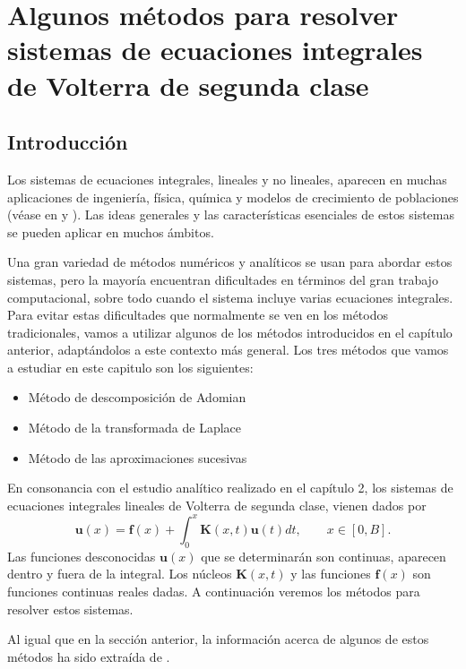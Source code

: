 \chapter{Algunos métodos para resolver sistemas de ecuaciones integrales de Volterra de segunda clase}
\section{Introducción}
Los sistemas de ecuaciones integrales, lineales y no lineales, aparecen en muchas aplicaciones de ingeniería, física, química y modelos de crecimiento de poblaciones (véase en \cite{sistemas1} y \cite{sistemas2}). Las ideas generales y las características esenciales de estos sistemas se pueden aplicar en muchos ámbitos.

Una gran variedad de métodos numéricos y analíticos se usan para abordar estos sistemas, pero la mayoría encuentran dificultades en términos del gran trabajo computacional, sobre todo cuando el sistema incluye varias ecuaciones integrales. Para evitar estas dificultades que normalmente se ven en los métodos tradicionales, vamos a utilizar algunos de los métodos introducidos en el capítulo anterior, adaptándolos a este contexto más general. Los tres métodos que vamos a estudiar en este capitulo son los siguientes:
\begin{itemize}
	\item Método de descomposición de Adomian
	\item Método de la transformada de Laplace
	\item Método de las aproximaciones sucesivas
\end{itemize}

En consonancia con el estudio analítico realizado en el capítulo 2, los sistemas de ecuaciones integrales lineales de Volterra de segunda clase, vienen dados por
\begin{equation}
	\textbf{u}(x) = \textbf{f}(x) + \int_0^x \textbf{K}(x,t)\textbf{u}(t)dt, \qquad x \in [0,B].
\end{equation}
Las funciones desconocidas $\textbf{u}(x)$ que se determinarán son continuas, aparecen dentro y fuera de la integral. Los núcleos $\textbf{K}(x,t)$ y las funciones $\textbf{f}(x)$ son funciones continuas reales dadas. A continuación veremos los métodos para resolver estos sistemas.

Al igual que en la sección anterior, la información acerca de algunos de estos métodos ha sido extraída de \cite{WazWaz}.
